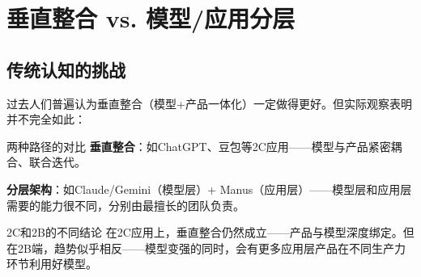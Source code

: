 \section{垂直整合 vs. 模型/应用分层}

\subsection{传统认知的挑战}

过去人们普遍认为垂直整合（模型+产品一体化）一定做得更好。但实际观察表明并不完全如此：

\begin{knowledgebox}{两种路径的对比}
\textbf{垂直整合}：如ChatGPT、豆包等2C应用——模型与产品紧密耦合、联合迭代。

\textbf{分层架构}：如Claude/Gemini（模型层）+ Manus（应用层）——模型层和应用层需要的能力很不同，分别由最擅长的团队负责。
\end{knowledgebox}

\begin{warningbox}{2C和2B的不同结论}
在2C应用上，垂直整合仍然成立——产品与模型深度绑定。但在2B端，趋势似乎相反——模型变强的同时，会有更多应用层产品在不同生产力环节利用好模型。
\end{warningbox}


